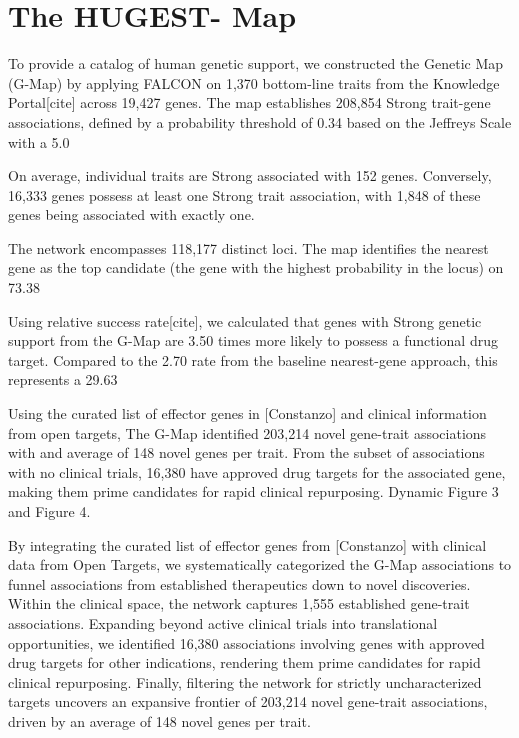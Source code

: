 \section{The HUGEST- Map}
\label{sec:map}

To provide a catalog of human genetic support, we constructed the Genetic Map (G-Map) by applying FALCON on 1,370 bottom-line traits from the Knowledge Portal[cite] across 19,427 genes. The map establishes 208,854 Strong trait-gene associations, defined by a probability threshold of 0.34 based on the Jeffreys Scale with a 5.0%

On average, individual traits are Strong associated with 152 genes. Conversely, 16,333 genes possess at least one Strong trait association, with 1,848 of these genes being associated with exactly one.

The network encompasses 118,177 distinct loci. The map identifies the nearest gene as the top candidate (the gene with the highest probability in the locus) on 73.38%

Using relative success rate[cite], we calculated that genes with Strong genetic support from the G-Map are 3.50 times more likely to possess a functional drug target. Compared to the 2.70 rate from the baseline nearest-gene approach, this represents a 29.63%

Using the curated list of effector genes in [Constanzo] and clinical information from open targets, The G-Map identified 203,214 novel gene-trait associations with and average of 148 novel genes per trait. From the subset of associations with no clinical trials, 16,380 have approved drug targets for the associated gene, making them prime candidates for rapid clinical repurposing. Dynamic Figure 3 and Figure 4.

By integrating the curated list of effector genes from [Constanzo] with clinical data from Open Targets, we systematically categorized the G-Map associations to funnel associations from established therapeutics down to novel discoveries. Within the clinical space, the network captures 1,555 established gene-trait associations. Expanding beyond active clinical trials into translational opportunities, we identified 16,380 associations involving genes with approved drug targets for other indications, rendering them prime candidates for rapid clinical repurposing. Finally, filtering the network for strictly uncharacterized targets uncovers an expansive frontier of 203,214 novel gene-trait associations, driven by an average of 148 novel genes per trait.

